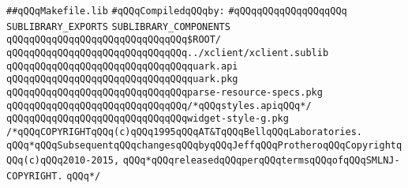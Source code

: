 \label{src/lib/x-kit/style/xkit-style.sublib}
\verb|##qQQqMakefile.lib|\newline
\newline
\verb|#qQQqCompiledqQQqby:|\newline
\verb|#qQQqqQQqqQQqqQQqqQQq|\newline
\newline
\verb|SUBLIBRARY_EXPORTS|\newline
\newline
\verb|SUBLIBRARY_COMPONENTS|\newline
\newline
\verb|qQQqqQQqqQQqqQQqqQQqqQQqqQQqqQQq$ROOT/|\newline
\verb|qQQqqQQqqQQqqQQqqQQqqQQqqQQqqQQq../xclient/xclient.sublib|\newline
\newline
\verb|qQQqqQQqqQQqqQQqqQQqqQQqqQQqqQQqquark.api|\newline
\verb|qQQqqQQqqQQqqQQqqQQqqQQqqQQqqQQqquark.pkg|\newline
\newline
\verb|qQQqqQQqqQQqqQQqqQQqqQQqqQQqqQQqparse-resource-specs.pkg|\newline
\verb|qQQqqQQqqQQqqQQqqQQqqQQqqQQqqQQq/*qQQqstyles.apiqQQq*/|\newline
\verb|qQQqqQQqqQQqqQQqqQQqqQQqqQQqqQQqwidget-style-g.pkg|\newline
\newline
\verb|/*qQQqCOPYRIGHTqQQq(c)qQQq1995qQQqAT&TqQQqBellqQQqLaboratories.|\newline
\verb|qQQq*qQQqSubsequentqQQqchangesqQQqbyqQQqJeffqQQqProtheroqQQqCopyrightqQQq(c)qQQq2010-2015,|\newline
\verb|qQQq*qQQqreleasedqQQqperqQQqtermsqQQqofqQQqSMLNJ-COPYRIGHT.|\newline
\verb|qQQq*/|\newline

